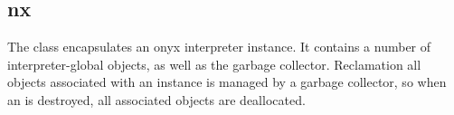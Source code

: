 %
%
%
%
%              

\subsection{nx}
\label{nx}

The  class encapsulates an onyx interpreter instance.  It contains
a number of interpreter-global objects, as well as the garbage collector.
Reclamation all objects associated with an  instance is managed by
a garbage collector, so when an  is destroyed, all associated
objects are deallocated.

